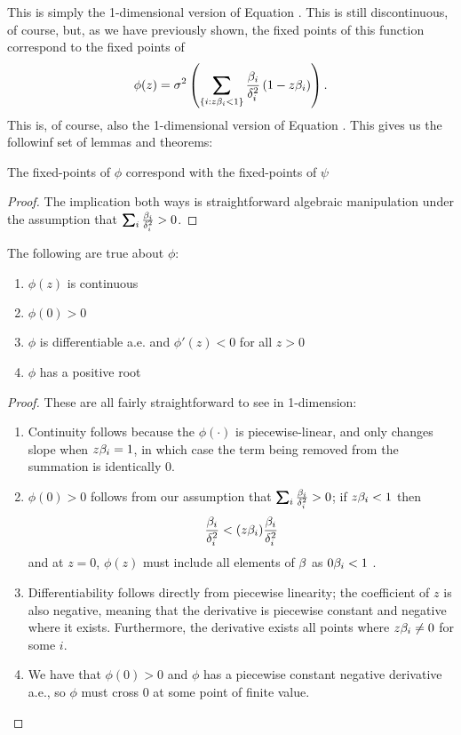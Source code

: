 \documentclass[12pt,leqno,letterpaper]{article}
\begin{document}
This is simply the 1-dimensional version of Equation .  This is still discontinuous, of course, but, as we have previously shown, the fixed points of this function correspond to the fixed points of 
\begin{align}\label{phi_1}
\phi(z) = \gs^2\paren{ \sum_{\{i:z\gb_i<1\}} 
\frac{\gb_i}{\gd_i^2}\paren{1 - z \gb_i}}.
\end{align}
This is, of course, also the 1-dimensional version of Equation .  This gives us the followinf set of lemmas and theorems:
\begin{lemma} 
The fixed-points of $\phi$ correspond with the fixed-points of $\psi$
\end{lemma}
\begin{proof}
The implication both ways is straightforward algebraic manipulation under the assumption that $\sum_i \frac{\gb_i}{\gd_i^2}>0$.
\end{proof}
\begin{lemma} The following are true about $\phi$:
\begin{enumerate}
\item $\phi(z)$ is continuous
\item $\phi(0)>0$
\item $\phi$ is differentiable a.e. and $\phi'(z)<0$ for all $z>0$
\item $\phi$ has a positive root
\end{enumerate}
\end{lemma}
\begin{proof}
These are all fairly straightforward to see in 1-dimension:
\begin{enumerate}
\item Continuity follows because the $\phi(\cdot)$ is piecewise-linear, and only changes slope when $z\beta_i = 1$, in which case the term being removed from the summation is identically $0$.
\item $\phi(0)>0$ follows from our assumption that $\sum_i \frac{\gb_i}{\gd_i^2}>0$; if $z\beta_i<1$ then 
\begin{align*}
\frac{\beta_i}{\delta_i^2}< (z\beta_i) \frac{\beta_i}{\delta_i^2}
\end{align*}
and at $z=0$, $\phi(z)$ must include all elements of $\beta$ as $0\beta_i <1$ .
\item Differentiability follows directly from piecewise linearity; the coefficient of $z$ is also negative, meaning that the derivative is piecewise constant and negative where it exists.  Furthermore, the derivative exists all points where $z\beta_i \neq 0$ for some $i$.
\item We have that $\phi(0)>0$ and $\phi$ has a piecewise constant negative derivative a.e., so $\phi$ must cross $0$ at some point of finite value.
\end{enumerate}
\end{proof}
\end{document}
